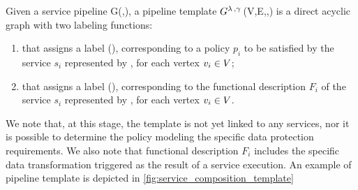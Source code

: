\begin{definition} \label{def:template}
  Given a service pipeline G(\V,\E), a pipeline template $G^{\lambda\,,\gamma\,}$(V,E,\myLambda,\myGamma) is a direct acyclic graph with two labeling functions:
  \begin{enumerate}[label=\roman*)]
    \item \myLambda that assigns a label \myLambda(), corresponding to a policy $p_i$ to be satisfied by the service $s_i$ represented by , for each vertex $v_{i}\in V$;
    \item \myGamma that assigns a label \myGamma(), corresponding to the functional description $F_i$ of the service $s_i$ represented by , for each vertex $v_{i}\in V$.
  \end{enumerate}
\end{definition}

We note that, at this stage, the template is not yet linked to any services, nor it is possible to determine the policy modeling the specific data protection requirements. We also note that functional description $F_i$ includes the specific data transformation triggered as the result of a service execution.
An example of pipeline template is depicted in \cref{fig:service_composition_template}

